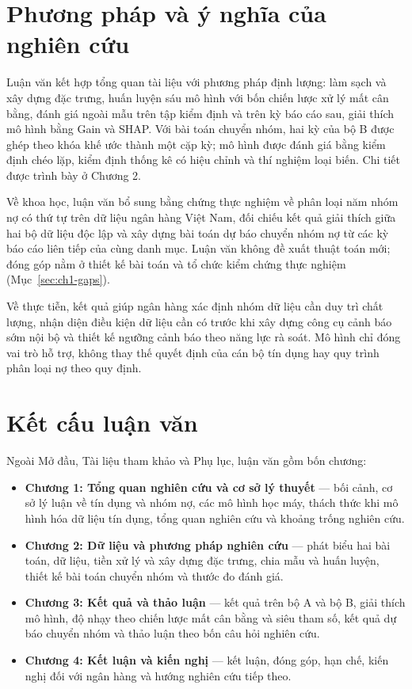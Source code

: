 \section*{Phương pháp và ý nghĩa của nghiên cứu}

Luận văn kết hợp tổng quan tài liệu với phương pháp định lượng: làm sạch và xây dựng đặc trưng, huấn luyện sáu mô hình với bốn chiến lược xử lý mất cân bằng, đánh giá ngoài mẫu trên tập kiểm định và trên kỳ báo cáo sau, giải thích mô hình bằng Gain và SHAP. Với bài toán chuyển nhóm, hai kỳ của bộ B được ghép theo khóa khế ước thành một cặp kỳ; mô hình được đánh giá bằng kiểm định chéo lặp, kiểm định thống kê có hiệu chỉnh và thí nghiệm loại biến. Chi tiết được trình bày ở Chương 2.

Về khoa học, luận văn bổ sung bằng chứng thực nghiệm về phân loại năm nhóm nợ có thứ tự trên dữ liệu ngân hàng Việt Nam, đối chiếu kết quả giải thích giữa hai bộ dữ liệu độc lập và xây dựng bài toán dự báo chuyển nhóm nợ từ các kỳ báo cáo liên tiếp của cùng danh mục. Luận văn không đề xuất thuật toán mới; đóng góp nằm ở thiết kế bài toán và tổ chức kiểm chứng thực nghiệm (Mục~\ref{sec:ch1-gaps}).

Về thực tiễn, kết quả giúp ngân hàng xác định nhóm dữ liệu cần duy trì chất lượng, nhận diện điều kiện dữ liệu cần có trước khi xây dựng công cụ cảnh báo sớm nội bộ và thiết kế ngưỡng cảnh báo theo năng lực rà soát. Mô hình chỉ đóng vai trò hỗ trợ, không thay thế quyết định của cán bộ tín dụng hay quy trình phân loại nợ theo quy định.

\section*{Kết cấu luận văn}

Ngoài Mở đầu, Tài liệu tham khảo và Phụ lục, luận văn gồm bốn chương:
\begin{itemize}
    \item \textbf{Chương 1: Tổng quan nghiên cứu và cơ sở lý thuyết} --- bối cảnh, cơ sở lý luận về tín dụng và nhóm nợ, các mô hình học máy, thách thức khi mô hình hóa dữ liệu tín dụng, tổng quan nghiên cứu và khoảng trống nghiên cứu.
    \item \textbf{Chương 2: Dữ liệu và phương pháp nghiên cứu} --- phát biểu hai bài toán, dữ liệu, tiền xử lý và xây dựng đặc trưng, chia mẫu và huấn luyện, thiết kế bài toán chuyển nhóm và thước đo đánh giá.
    \item \textbf{Chương 3: Kết quả và thảo luận} --- kết quả trên bộ A và bộ B, giải thích mô hình, độ nhạy theo chiến lược mất cân bằng và siêu tham số, kết quả dự báo chuyển nhóm và thảo luận theo bốn câu hỏi nghiên cứu.
    \item \textbf{Chương 4: Kết luận và kiến nghị} --- kết luận, đóng góp, hạn chế, kiến nghị đối với ngân hàng và hướng nghiên cứu tiếp theo.
\end{itemize}
